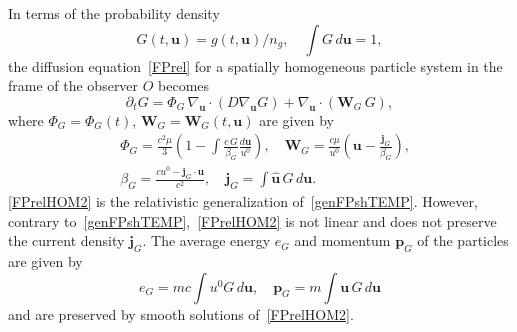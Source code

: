\documentclass[12pt]{article}
\theoremstyle{definition}
\numberwithin{equation}{section}
\begin{document}
In terms of the probability density 
\[
G(t,{\bm u})=g(t,{\bm u})/n_g,\quad \int G\,d{\bm u}=1,
\]
the diffusion equation~\eqref{FPrel} for a spatially homogeneous particle system in the frame of the observer $O$ becomes
\begin{equation}\label{FPrelHOM2}
\partial_tG=\Phi_G\,\nabla_{\bm u}\cdot\left(D\nabla_{\bm u}G\right)+\nabla_{{\bm u}}\cdot({\bm W}_G\,G),
\end{equation}
where 
$\Phi_G=\Phi_G(t)$, ${\bm W}_G={\bm W}_G(t,{\bm u})$ are given by
\begin{align*}
&\Phi_G=\frac{c^2\mu}{3}\left(1-\int \frac{c\, G}{\beta_G}\frac{d{\bm u}}{u^0}\right),\quad{\bm W}_G=\frac{c\mu}{u^0}\left({\bm u}-\frac{{\bm j}_G}{\beta_G}\right),\\
 &\beta_G=\frac{c u^0-{\bm j}_G\cdot{\bm u}}{c^2},\quad {\bm j}_G=\int  {\bm {\widehat{u}}}\,G\, d{\bm u}.
\end{align*}
\eqref{FPrelHOM2} is the relativistic generalization of~\eqref{genFPshTEMP}. 
However, contrary to~\eqref{genFPshTEMP},~\eqref{FPrelHOM2} is not linear and does not preserve the current density ${\bm j}_G$. 
The average energy $e_G$ and momentum ${\bm p}_G$ of the particles are given by
\[
e_G=mc\int u^0 G\, d{\bm u},\quad {\bm p}_G=m\int {\bm u}\, G\, d{\bm u}
\]
and are preserved by smooth solutions of~\eqref{FPrelHOM2}. 
\end{document}
